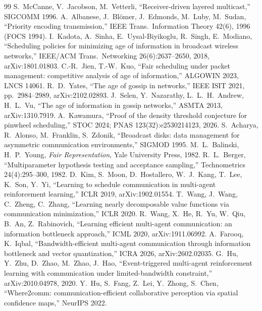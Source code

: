 \documentclass[11pt]{article}
\theoremstyle{definition}
\begin{document}
\begin{thebibliography}{99}\small
{} S.~McCanne, V.~Jacobson, M.~Vetterli, ``Receiver-driven layered multicast,'' SIGCOMM 1996.
 A.~Albanese, J.~Bl\"omer, J.~Edmonds, M.~Luby, M.~Sudan, ``Priority encoding transmission,'' IEEE Trans.\
Information Theory 42(6), 1996 (FOCS 1994).
 I.~Kadota, A.~Sinha, E.~Uysal-Biyikoglu, R.~Singh, E.~Modiano, ``Scheduling policies for minimizing
age of information in broadcast wireless networks,'' IEEE/ACM Trans.\ Networking 26(6):2637--2650, 2018, arXiv:1801.01803.
\bibitem{jien2023} C.-R.~Jien, T.-W.~Kuo, ``Fair scheduling under packet management: competitive analysis of age of
information,'' ALGOWIN 2023, LNCS 14061.
 R.~D.~Yates, ``The age of gossip in networks,'' IEEE ISIT 2021, pp.\ 2984--2989, arXiv:2102.02893.
\bibitem{selen2013} J.~Selen, Y.~Nazarathy, L.~L.~H.~Andrew, H.~L.~Vu, ``The age of information in gossip networks,''
ASMTA 2013, arXiv:1310.7919.
 A.~Kawamura, ``Proof of the density threshold conjecture for pinwheel scheduling,'' STOC 2024;
PNAS 123(32):e2530214123, 2026.
 S.~Acharya, R.~Alonso, M.~Franklin, S.~Zdonik, ``Broadcast disks: data management for
asymmetric communication environments,'' SIGMOD 1995.
 M.~L.~Balinski, H.~P.~Young, \emph{Fair Representation}, Yale University Press, 1982.
\bibitem{berger1982} R.~L.~Berger, ``Multiparameter hypothesis testing and acceptance sampling,'' Technometrics 24(4):295--300,
1982.
 D.~Kim, S.~Moon, D.~Hostallero, W.~J.~Kang, T.~Lee, K.~Son, Y.~Yi, ``Learning to schedule
communication in multi-agent reinforcement learning,'' ICLR 2019, arXiv:1902.01554.
\bibitem{ndq} T.~Wang, J.~Wang, C.~Zheng, C.~Zhang, ``Learning nearly decomposable value functions via communication
minimization,'' ICLR 2020.
 R.~Wang, X.~He, R.~Yu, W.~Qiu, B.~An, Z.~Rabinovich, ``Learning efficient multi-agent communication: an
information bottleneck approach,'' ICML 2020, arXiv:1911.06992.
 A.~Farooq, K.~Iqbal, ``Bandwidth-efficient multi-agent communication through information bottleneck and
vector quantization,'' ICRA 2026, arXiv:2602.02035.
 G.~Hu, Y.~Zhu, D.~Zhao, M.~Zhao, J.~Hao, ``Event-triggered multi-agent reinforcement learning with
communication under limited-bandwidth constraint,'' arXiv:2010.04978, 2020.
\bibitem{where2comm} Y.~Hu, S.~Fang, Z.~Lei, Y.~Zhong, S.~Chen, ``Where2comm: communication-efficient collaborative
perception via spatial confidence maps,'' NeurIPS 2022.

\end{thebibliography}
\end{document}
